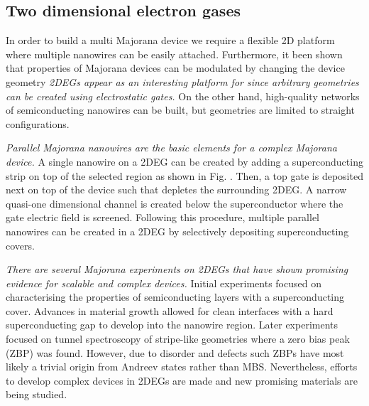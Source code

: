 

\subsection{Two dimensional electron gases}

In order to build a multi Majorana device we require a flexible 2D platform where multiple nanowires can be easily attached.
Furthermore, it been shown that properties of Majorana devices can be modulated by changing the device geometry
\textit{2DEGs appear as an interesting platform for since arbitrary geometries can be created using electrostatic gates.}
On the other hand, high-quality networks of semiconducting nanowires can be built, but geometries are limited to straight configurations.

\textit{Parallel Majorana nanowires are the basic elements for a complex Majorana device.}
A single nanowire on a 2DEG can be created by adding a superconducting strip on top of the selected region as shown in Fig. .
Then, a top gate is deposited next on top of the device such that depletes the surrounding 2DEG.
A narrow quasi-one dimensional channel is created below the superconductor where the gate electric field is screened.
Following this procedure, multiple parallel nanowires can be created in a 2DEG by selectively depositing superconducting covers.

\textit{There are several Majorana experiments on 2DEGs that have shown promising evidence for scalable and complex devices.}
Initial experiments\cite{Shabani2015,Kjaergaard2016} focused on characterising the properties of semiconducting layers with a superconducting cover.
Advances in material growth allowed for clean interfaces with a hard superconducting gap to develop into the nanowire region.
Later experiments focused on tunnel spectroscopy of stripe-like geometries\cite{Suominen2017} where a zero bias peak (ZBP) was found.
However, due to disorder and defects such ZBPs have most likely a trivial origin from Andreev states rather than MBS.
Nevertheless, efforts to develop complex devices in 2DEGs are made and new promising materials are being studied.

